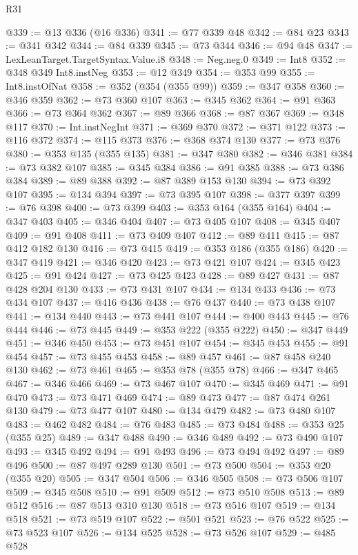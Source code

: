 \begin{lexlean}{R31}
\begin{coremodule}
@339 := @13 @336 (@16 @336)
@341 := @77 @339 @48
@342 := @84 @23
@343 := @341 @342
@344 := @84 @339
@345 := @73 @344
@346 := @94 @48
@347 := LexLeanTarget.TargetSyntax.Value.i8
@348 := Neg.neg.{0}
@349 := Int8
@352 := @348 @349 Int8.instNeg
@353 := @12 @349
@354 := @353 @99
@355 := Int8.instOfNat
@358 := @352 (@354 (@355 @99))
@359 := @347 @358
@360 := @346 @359
@362 := @73 @360 @107
@363 := @345 @362
@364 := @91 @363
@366 := @73 @364 @362
@367 := @89 @366
@368 := @87 @367
@369 := @348 @117
@370 := Int.instNegInt
@371 := @369 @370
@372 := @371 @122
@373 := @116 @372
@374 := @115 @373
@376 := @368 @374 @130
@377 := @73 @376
@380 := @353 @135 (@355 @135)
@381 := @347 @380
@382 := @346 @381
@384 := @73 @382 @107
@385 := @345 @384
@386 := @91 @385
@388 := @73 @386 @384
@389 := @89 @388
@392 := @87 @389 @153 @130
@394 := @73 @392 @107
@395 := @134 @394
@397 := @73 @395 @107
@398 := @377 @397
@399 := @76 @398
@400 := @73 @399
@403 := @353 @164 (@355 @164)
@404 := @347 @403
@405 := @346 @404
@407 := @73 @405 @107
@408 := @345 @407
@409 := @91 @408
@411 := @73 @409 @407
@412 := @89 @411
@415 := @87 @412 @182 @130
@416 := @73 @415
@419 := @353 @186 (@355 @186)
@420 := @347 @419
@421 := @346 @420
@423 := @73 @421 @107
@424 := @345 @423
@425 := @91 @424
@427 := @73 @425 @423
@428 := @89 @427
@431 := @87 @428 @204 @130
@433 := @73 @431 @107
@434 := @134 @433
@436 := @73 @434 @107
@437 := @416 @436
@438 := @76 @437
@440 := @73 @438 @107
@441 := @134 @440
@443 := @73 @441 @107
@444 := @400 @443
@445 := @76 @444
@446 := @73 @445
@449 := @353 @222 (@355 @222)
@450 := @347 @449
@451 := @346 @450
@453 := @73 @451 @107
@454 := @345 @453
@455 := @91 @454
@457 := @73 @455 @453
@458 := @89 @457
@461 := @87 @458 @240 @130
@462 := @73 @461
@465 := @353 @78 (@355 @78)
@466 := @347 @465
@467 := @346 @466
@469 := @73 @467 @107
@470 := @345 @469
@471 := @91 @470
@473 := @73 @471 @469
@474 := @89 @473
@477 := @87 @474 @261 @130
@479 := @73 @477 @107
@480 := @134 @479
@482 := @73 @480 @107
@483 := @462 @482
@484 := @76 @483
@485 := @73 @484
@488 := @353 @25 (@355 @25)
@489 := @347 @488
@490 := @346 @489
@492 := @73 @490 @107
@493 := @345 @492
@494 := @91 @493
@496 := @73 @494 @492
@497 := @89 @496
@500 := @87 @497 @289 @130
@501 := @73 @500
@504 := @353 @20 (@355 @20)
@505 := @347 @504
@506 := @346 @505
@508 := @73 @506 @107
@509 := @345 @508
@510 := @91 @509
@512 := @73 @510 @508
@513 := @89 @512
@516 := @87 @513 @310 @130
@518 := @73 @516 @107
@519 := @134 @518
@521 := @73 @519 @107
@522 := @501 @521
@523 := @76 @522
@525 := @73 @523 @107
@526 := @134 @525
@528 := @73 @526 @107
@529 := @485 @528

\end{coremodule}
\end{lexlean}

